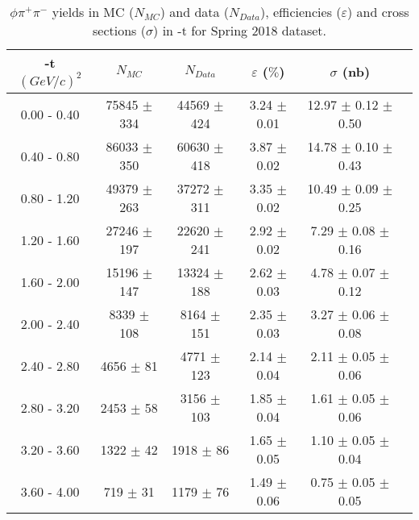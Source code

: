 \begin{center}
\begin{table}[H]
    \caption{$\phi \pi^{+}\pi^{-}$ yields in MC ($N_{MC}$) and data ($N_{Data}$), efficiencies ($\varepsilon$) and cross sections ($\sigma$) in $\mbox{-t}$ for Spring 2018 dataset.}
    \label{tab.y2175.xsec_ul.phi2pi.3.2}
    \begin{tabular}{|c|c|c|c|c|c|}
    \hline
    -t $(GeV/c)^{2}$ & $N_{MC}$ & $N_{Data}$ & $\varepsilon$ ($\%$) & $\sigma$ (nb) \\ 
    \hline
    0.00 - 0.40 & 75845 $\pm$ 334 & 44569 $\pm$ 424 & 3.24 $\pm$ 0.01 & 12.97 $\pm$ 0.12 $\pm$ 0.50 \\ 
    0.40 - 0.80 & 86033 $\pm$ 350 & 60630 $\pm$ 418 & 3.87 $\pm$ 0.02 & 14.78 $\pm$ 0.10 $\pm$ 0.43 \\ 
    0.80 - 1.20 & 49379 $\pm$ 263 & 37272 $\pm$ 311 & 3.35 $\pm$ 0.02 & 10.49 $\pm$ 0.09 $\pm$ 0.25 \\ 
    1.20 - 1.60 & 27246 $\pm$ 197 & 22620 $\pm$ 241 & 2.92 $\pm$ 0.02 & 7.29 $\pm$ 0.08 $\pm$ 0.16 \\ 
    1.60 - 2.00 & 15196 $\pm$ 147 & 13324 $\pm$ 188 & 2.62 $\pm$ 0.03 & 4.78 $\pm$ 0.07 $\pm$ 0.12 \\ 
    2.00 - 2.40 & 8339 $\pm$ 108 & 8164 $\pm$ 151 & 2.35 $\pm$ 0.03 & 3.27 $\pm$ 0.06 $\pm$ 0.08 \\ 
    2.40 - 2.80 & 4656 $\pm$ 81 & 4771 $\pm$ 123 & 2.14 $\pm$ 0.04 & 2.11 $\pm$ 0.05 $\pm$ 0.06 \\ 
    2.80 - 3.20 & 2453 $\pm$ 58 & 3156 $\pm$ 103 & 1.85 $\pm$ 0.04 & 1.61 $\pm$ 0.05 $\pm$ 0.06 \\ 
    3.20 - 3.60 & 1322 $\pm$ 42 & 1918 $\pm$ 86 & 1.65 $\pm$ 0.05 & 1.10 $\pm$ 0.05 $\pm$ 0.04 \\ 
    3.60 - 4.00 & 719 $\pm$ 31 & 1179 $\pm$ 76 & 1.49 $\pm$ 0.06 & 0.75 $\pm$ 0.05 $\pm$ 0.05 \\ 
   \hline
\end{tabular}
\end{table}
\end{center}
 
